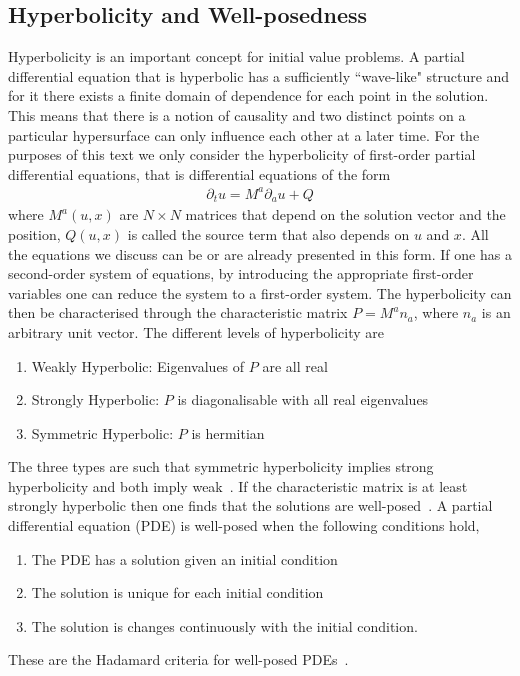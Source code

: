 \documentclass[10pt]{report}
\theoremstyle{definition}
\begin{document}
\subsection{Hyperbolicity and Well-posedness} \label{sec:num-hyperbolicity-and-well-posedness}
Hyperbolicity is an important concept for initial value problems. A partial differential equation that is hyperbolic has a sufficiently  ``wave-like" structure and for it there exists a finite domain of dependence for each point in the solution. This means that there is a notion of causality and two distinct points on a particular hypersurface can only influence each other at a later time. For the purposes of this text we only consider the hyperbolicity of first-order partial differential equations, that is differential equations of the form
\begin{align}
    \partial_t u = M^a \partial_a u + Q \label{eq:num-first-order-hyperbolic-system}
\end{align}
where $M^a(u,x)$ are $N \times N$ matrices that depend on the solution vector and the position, $Q(u,x)$ is called the source term that also depends on $u$ and $x$. All the equations we discuss can be or are already presented in this form. If one has a second-order system of equations, by introducing the appropriate first-order variables one can reduce the system to a first-order system. The hyperbolicity can then be characterised through the characteristic matrix $P = M^a n_a$, where $n_a$ is an arbitrary unit vector. The different levels of hyperbolicity are
\begin{enumerate}
    \item Weakly Hyperbolic: Eigenvalues of $P$ are all real
    \item Strongly Hyperbolic: $P$ is diagonalisable with all real eigenvalues
    \item Symmetric Hyperbolic: $P$ is hermitian
\end{enumerate}
The three types are such that symmetric hyperbolicity implies strong hyperbolicity and both imply weak~\cite{Kreiss1989-cm}. If the characteristic matrix is at least strongly hyperbolic then one finds that the solutions are well-posed~\cite{An_Introduction_Hildit_2013}. A partial differential equation (PDE) is well-posed when the following conditions hold,
\begin{enumerate}
    \item The PDE has a solution given an initial condition
    \item The solution is unique for each initial condition
    \item The solution is changes continuously with the initial condition.
\end{enumerate}
These are the Hadamard criteria for well-posed PDEs~\cite{SurLesProblemsHadamard1920}.
\end{document}
